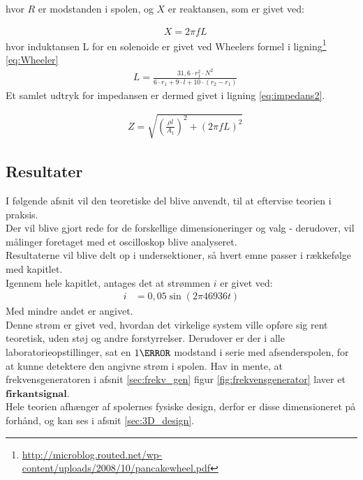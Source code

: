 hvor $R$ er modstanden i spolen, og $X$ er reaktansen, som er givet ved:

\begin{align}
	& X=2\pi f L \nonumber
\end{align}
hvor induktansen L for en solenoide er givet ved Wheelers formel i ligning\footnote{\url{http://microblog.routed.net/wp-content/uploads/2008/10/pancakewheel.pdf}} \ref{eq:Wheeler}
\begin{align}
	& L =\frac{31,6\cdot r_1^2\cdot N^2}{6\cdot r_1+9\cdot l + 10\cdot (r_2-r_1)}  \label{eq:Wheeler}
\end{align}
Et samlet udtryk for impedansen er dermed givet i ligning \ref{eq:impedans2}.

\begin{align}
	& Z=\sqrt{\left(\frac{\rho l}{A_1}\right)^2+\left(2\pi f L\right)^2} \label{eq:impedans2}
\end{align}


\subsection{Resultater}
I følgende afsnit vil den teoretiske del blive anvendt, til at eftervise teorien i praksis.\\
Der vil blive gjort rede for de forskellige dimensioneringer og valg - derudover, vil målinger foretaget med et oscilloskop blive analyseret.\\ 
Resultaterne vil blive delt op i undersektioner, så hvert emne passer i rækkefølge med kapitlet.\\
Igennem hele kapitlet, antages det at strømmen $i$ er givet ved:
\begin{align}
	 i&=0,05\sin{(2\pi46936 t)} \nonumber
\end{align}
Med mindre andet er angivet.\\
Denne strøm er givet ved, hvordan det virkelige system ville opføre sig rent teoretisk, uden støj og andre forstyrrelser.
Derudover er der i alle laboratorieopstillinger, sat en $1\ohm$ modstand i serie med afsenderspolen, for at kunne detektere den angivne strøm i spolen.
Hav in mente, at frekvensgeneratoren i afsnit \ref{sec:frekv_gen} figur \ref{fig:frekvensgenerator} laver et $\textbf{firkantsignal}$.\\ 
Hele teorien afhænger af spolernes fysiske design, derfor er disse dimensioneret på forhånd, og kan ses i afsnit \ref{sec:3D_design}.
